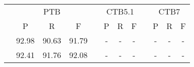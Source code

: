\begin{table*}[tb]
    \centering
    \begin{tabularx}{\textwidth}{lccccccccccc}
        \toprule
                                                        & \multicolumn{3}{c}{PTB}  &                          & \multicolumn{3}{c}{CTB5.1} &  & \multicolumn{3}{c}{CTB7}                                                                                                             \\
                                                        & P                        & R                        & F                          &  & P                        & R                        & F                        &  & P              & R              & F              \\
        \midrule
        \cite{stern-etal-2017-minimal}                  & 92.98                    & 90.63                    & 91.79                      &  & -                        & -                        & -                        &  & -              & -              & -              \\
        \cite{gaddy-etal-2018-whats}                    & 92.41                    & 91.76                    & 92.08                      &  & -                        & -                        & -                        &  & -              & -              & -              \\

\end{tabularx}
\end{table*}
